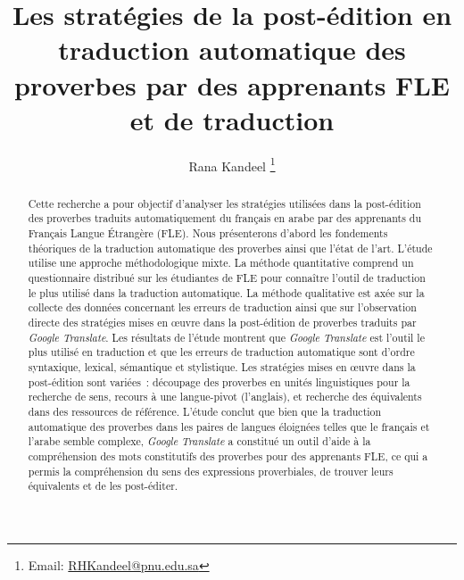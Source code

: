 \documentclass[french]{textolivre}
\title{Les stratégies de la post-édition en traduction automatique des proverbes par des apprenants FLE et de traduction}
\author[1]{Rana Kandeel \orcid{0000-0002-8523-4169} \thanks{Email: \url{RHKandeel@pnu.edu.sa}}}
\affil[1]{Translation Department, College of Languages, Princess Nourah Bint Abdulrahman University, Riyadh, Saudi-Arabia.}
\begin{document}
\maketitle

\begin{polyabstract}
\begin{abstract}
Cette recherche a pour objectif d’analyser les stratégies utilisées dans la post-édition des proverbes traduits automatiquement du français en arabe par des apprenants du Français Langue Étrangère (FLE). Nous présenterons d’abord les fondements théoriques de la traduction automatique des proverbes ainsi que l’état de l’art. L’étude utilise une approche méthodologique mixte. La méthode quantitative comprend un questionnaire distribué sur les étudiantes de FLE pour connaître l’outil de traduction le plus utilisé dans la traduction automatique. La méthode qualitative est axée sur la collecte des données concernant les erreurs de traduction ainsi que sur l’observation directe des stratégies mises en œuvre dans la post-édition de proverbes traduits par \textit{Google Translate}. Les résultats de l’étude montrent que \textit{Google Translate} est l’outil le plus utilisé en traduction et que les erreurs de traduction automatique sont d’ordre syntaxique, lexical, sémantique et stylistique. Les stratégies mises en œuvre dans la post-édition sont variées : découpage des proverbes en unités linguistiques pour la recherche de sens, recours à une langue-pivot (l’anglais), et recherche des équivalents dans des ressources de référence. L’étude conclut que bien que la traduction automatique des proverbes dans les paires de langues éloignées telles que le français et l’arabe semble complexe, \textit{Google Translate} a constitué un outil d’aide à la compréhension des mots constitutifs des proverbes pour des apprenants FLE, ce qui a permis la compréhension du sens des expressions proverbiales, de trouver leurs équivalents et de les post-éditer.

\end{abstract}


\end{polyabstract}
\end{document}
